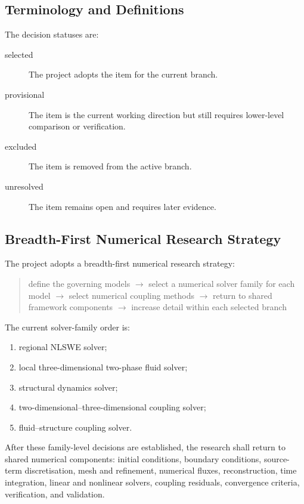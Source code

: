 \subsection{Terminology and Definitions}
\label{sec:res-num-spec-definitions}

The decision statuses are:

\begin{description}
  \item[selected] The project adopts the item for the current branch.
  \item[provisional] The item is the current working direction but still
    requires lower-level comparison or verification.
  \item[excluded] The item is removed from the active branch.
  \item[unresolved] The item remains open and requires later evidence.
\end{description}

\subsection{Breadth-First Numerical Research Strategy}
\label{sec:res-num-spec-breadth-first-strategy}

The project adopts a breadth-first numerical research strategy:

\begin{quote}
  define the governing models
  $\rightarrow$
  select a numerical solver family for each model
  $\rightarrow$
  select numerical coupling methods
  $\rightarrow$
  return to shared framework components
  $\rightarrow$
  increase detail within each selected branch
\end{quote}

The current solver-family order is:

\begin{enumerate}
  \item regional NLSWE solver;
  \item local three-dimensional two-phase fluid solver;
  \item structural dynamics solver;
  \item two-dimensional--three-dimensional coupling solver;
  \item fluid--structure coupling solver.
\end{enumerate}

After these family-level decisions are established, the research shall
return to shared numerical components: initial conditions, boundary
conditions, source-term discretisation, mesh and refinement, numerical
fluxes, reconstruction, time integration, linear and nonlinear solvers,
coupling residuals, convergence criteria, verification, and validation.

